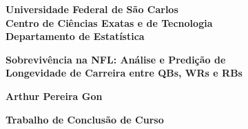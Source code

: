 \thispagestyle{empty} 


\begin{center}
{\large \bf \sc Universidade Federal de São Carlos \\
Centro de Ciências Exatas e de Tecnologia \\
Departamento de Estatística} \\
\end{center}
\vspace*{6cm}

\begin{center}
{\Large{\bf  Sobrevivência na NFL: Análise e Predição de \\
Longevidade de Carreira entre QBs, WRs e RBs}}
\end{center}
\vspace*{2cm}

\begin{center} 
 {\large \bf Arthur Pereira Gon} 
\end{center}
\vspace*{7.8cm}

\begin{center} 
{\large \bf Trabalho de Conclusão de Curso} 
\end{center}